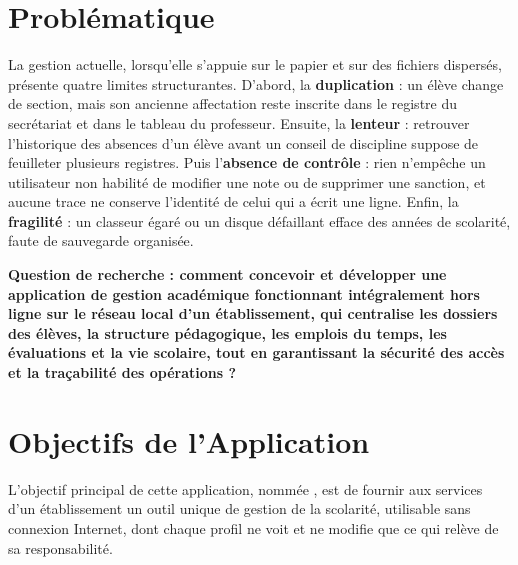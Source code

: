 \section*{Problématique}
La gestion actuelle, lorsqu'elle s'appuie sur le papier et sur des fichiers dispersés, présente quatre
limites structurantes. D'abord, la \textbf{duplication} : un élève change de section, mais son ancienne
affectation reste inscrite dans le registre du secrétariat et dans le tableau du professeur. Ensuite,
la \textbf{lenteur} : retrouver l'historique des absences d'un élève avant un conseil de discipline
suppose de feuilleter plusieurs registres. Puis l'\textbf{absence de contrôle} : rien n'empêche un
utilisateur non habilité de modifier une note ou de supprimer une sanction, et aucune trace ne
conserve l'identité de celui qui a écrit une ligne. Enfin, la \textbf{fragilité} : un classeur égaré ou
un disque défaillant efface des années de scolarité, faute de sauvegarde organisée.

\textbf{Question de recherche : comment concevoir et développer une application de gestion académique
fonctionnant intégralement hors ligne sur le réseau local d'un établissement, qui centralise les
dossiers des élèves, la structure pédagogique, les emplois du temps, les évaluations et la vie
scolaire, tout en garantissant la sécurité des accès et la traçabilité des opérations ?}

\section*{Objectifs de l'Application}
L'objectif principal de cette application, nommée \textbf{\appname}, est de fournir aux services d'un
établissement un outil unique de gestion de la scolarité, utilisable sans connexion Internet, dont
chaque profil ne voit et ne modifie que ce qui relève de sa responsabilité.

